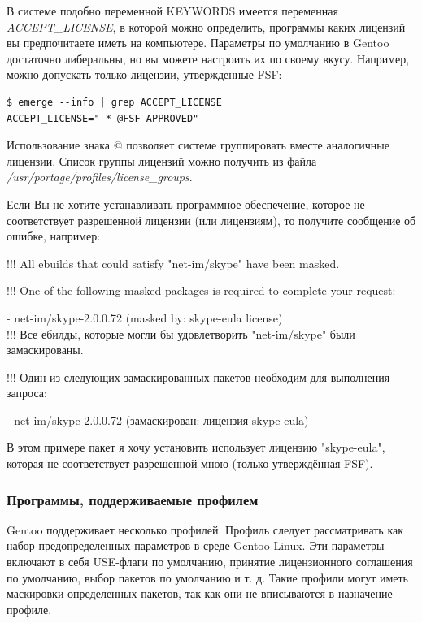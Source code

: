 \documentclass[10pt]{book}
\begin{document}
В системе подобно переменной KEYWORDS имеется переменная \textit{ACCEPT\_LICENSE}, в которой можно определить, программы каких лицензий вы предпочитаете иметь на компьютере. Параметры по умолчанию в Gentoo достаточно либеральны, но вы можете настроить их по своему вкусу. Например, можно допускать только лицензии, утвержденные FSF:
\begin{tcolorbox}
\begin{lstlisting}
$ emerge --info | grep ACCEPT_LICENSE
ACCEPT_LICENSE="-* @FSF-APPROVED"
\end{lstlisting}
\end{tcolorbox}

Использование знака $@$ позволяет системе группировать вместе аналогичные лицензии. Список группы лицензий можно получить из файла \textit{ /usr/portage/profiles/license\_groups}.

Если Вы не хотите устанавливать программное обеспечение, которое не соответствует разрешенной лицензии (или лицензиям), то получите сообщение об ошибке, например:

\begin{tcolorbox}
!!! All ebuilds that could satisfy "net-im/skype" have been masked.

!!! One of the following masked packages is required to complete your request:

- net-im/skype-2.0.0.72 (masked by: skype-eula license) \\

!!! Все ебилды, которые могли бы удовлетворить "net-im/skype" были замаскированы.

!!! Один из следующих замаскированных пакетов необходим для выполнения запроса:

- net-im/skype-2.0.0.72 (замаскирован: лицензия skype-eula)
\end{tcolorbox}

В этом примере пакет я хочу установить использует лицензию "skype-eula", которая не соответствует разрешенной мною (только утверждённая FSF).

\subsubsection{Программы, поддерживаемые профилем}
Gentoo поддерживает несколько профилей. Профиль следует рассматривать как набор предопределенных параметров в среде Gentoo Linux. Эти параметры включают в себя USE-флаги по умолчанию, принятие лицензионного соглашения по умолчанию, выбор пакетов по умолчанию и т. д. Такие профили могут иметь маскировки определенных пакетов, так как они не вписываются в назначение профиле.
\end{document}

